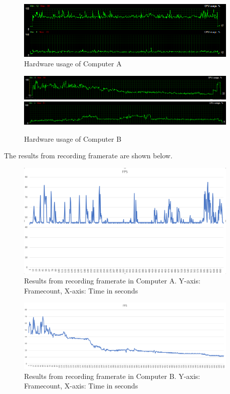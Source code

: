 \begin{figure}[H]
\centering
\includegraphics[width=0.95\textwidth]{InternalTest/B_usage.PNG}
\caption{Hardware usage of Computer A}
\end{figure}

\begin{figure}[H]
\centering
\includegraphics[width=0.95\textwidth]{InternalTest/C_gpu.PNG}
\includegraphics[width=0.95\textwidth]{InternalTest/C_cpu.PNG}
\caption{Hardware usage of Computer B}
\end{figure}

The results from recording framerate are shown below. 

\begin{figure}[H]
\centering
\includegraphics[width=0.95\textwidth]{InternalTest/A_fps.PNG}
\caption{Results from recording framerate in Computer A. Y-axis: Framecount, X-axis: Time in seconds}
\end{figure}

\begin{figure}[H]
\centering
\includegraphics[width=0.95\textwidth]{InternalTest/B_fps.PNG}
\caption{Results from recording framerate in Computer B. Y-axis: Framecount, X-axis: Time in seconds}
\end{figure}


